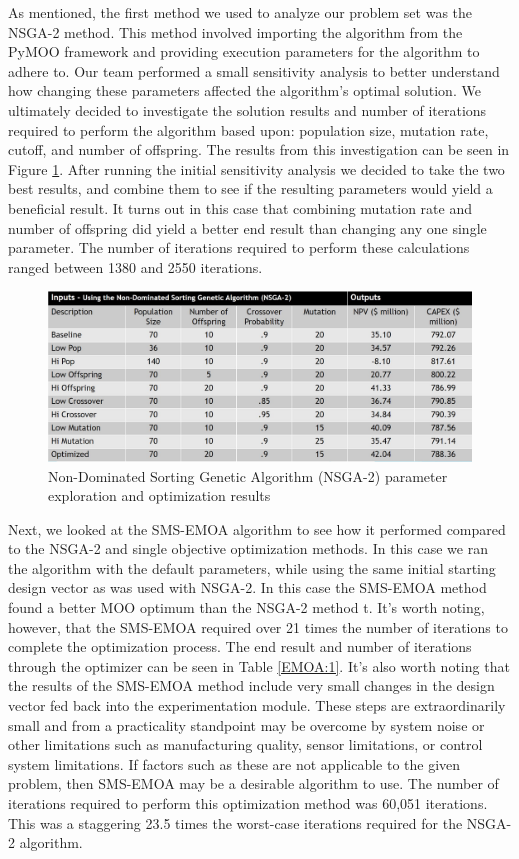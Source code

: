 \documentclass[balance,upint,subscriptcorrection,varvw,mathalfa=cal=boondoxo,spanish,french,vietnamese,russian,greek,pdf-a,colorlinks]{asmeconf}
\begin{document}
As mentioned, the first method we used to analyze our problem set was the NSGA-2 method. This method involved importing the algorithm from the PyMOO framework and providing execution parameters for the algorithm to adhere to. Our team performed a small sensitivity analysis to better understand how changing these parameters affected the algorithm's optimal solution. We ultimately decided to investigate the solution results and number of iterations required to perform the algorithm based upon: population size, mutation rate, cutoff, and number of offspring. The results from this investigation can be seen in Figure \ref{NSGA:1}. After running the initial sensitivity analysis we decided to take the two best results, and combine them to see if the resulting parameters would yield a beneficial result. It turns out in this case that combining mutation rate and number of offspring did yield a better end result than changing any one single parameter. The number of iterations required to perform these calculations ranged between 1380 and 2550 iterations.



\begin{figure}[btp]
\centering\includegraphics[width=0.7\linewidth]{images/NSGA.jpg}
\caption{Non-Dominated Sorting Genetic Algorithm (NSGA-2) parameter exploration and optimization results}\label{NSGA:1}
\end{figure}


Next, we looked at the SMS-EMOA algorithm to see how it performed compared to the NSGA-2 and single objective optimization methods. In this case we ran the algorithm with the default parameters, while using the same initial starting design vector as was used with NSGA-2. In this case the SMS-EMOA method found a better MOO optimum than the NSGA-2 method t. It's worth noting, however, that the SMS-EMOA required over 21 times the number of iterations to complete the optimization process. The end result and number of iterations through the optimizer can be seen in Table \ref{EMOA:1}. It's also worth noting that the results of the SMS-EMOA method include very small changes in the design vector fed back into the experimentation module. These steps are extraordinarily small and from a practicality standpoint may be overcome by system noise or other  limitations such as manufacturing quality, sensor limitations, or control system limitations. If factors such as these are not applicable to the given problem, then SMS-EMOA may be a desirable algorithm to use. The number of iterations required to perform this optimization method was 60,051 iterations. This was a staggering 23.5 times the worst-case iterations required for the NSGA-2 algorithm.   
\end{document}
